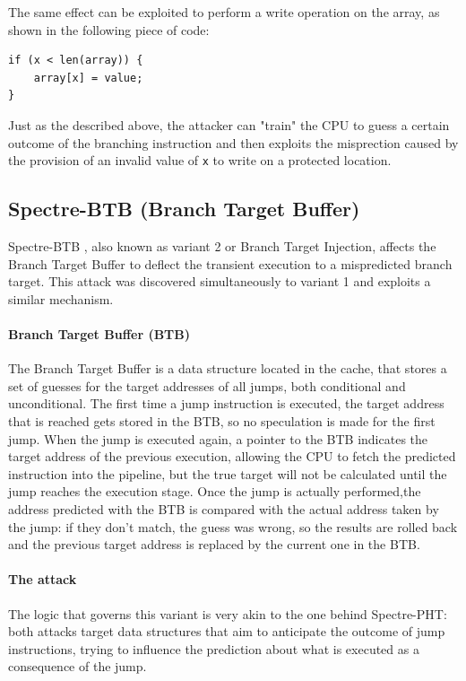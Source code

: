\documentclass[12pt,a4paper]{book}
\theoremstyle{definition}
\begin{document}
	The same effect can be exploited to perform a write operation on the array, as shown in the following piece of code:
	\begin{lstlisting}
if (x < len(array)) { 
	array[x] = value; 
}
	\end{lstlisting}  
	Just as the described above, the attacker can "train" the CPU to guess a certain outcome of the branching instruction and then exploits the misprection caused by the provision of an invalid value of \texttt{x} to write on a protected location.
	\subsection{Spectre-BTB (Branch Target Buffer)}\label{sec:spectre-btb}
	Spectre-BTB \cite{Kocher2019} \cite{Canella2019}, also known as variant 2 or Branch Target Injection, affects the Branch Target Buffer to deflect the transient execution to a mispredicted branch target. This attack was discovered simultaneously to variant 1 and exploits a similar mechanism.
	
	\paragraph{Branch Target Buffer (BTB)} The Branch Target Buffer \cite{Perleberg1989} is a data structure located in the cache, that stores a set of guesses for the target addresses of all jumps, both conditional and unconditional. The first time a jump instruction is executed, the target address that is reached gets stored in the BTB, so no speculation is made for the first jump. When the jump is executed again, a pointer to the BTB indicates the target address of the previous execution, allowing the CPU to fetch the  predicted instruction into the pipeline, but the true target will not be calculated until the jump reaches the execution stage. Once the jump is actually performed,the address predicted with the BTB is compared with the actual address taken by the jump: if they don't match, the guess was wrong, so the results are rolled back and the previous target address is replaced by the current one in the BTB.
	\paragraph{The attack} The logic that governs this variant is very akin to the one behind Spectre-PHT: both attacks target data structures that aim to anticipate the outcome of jump instructions, trying to influence the prediction about what is executed as a consequence of the jump.
	
\end{document}
